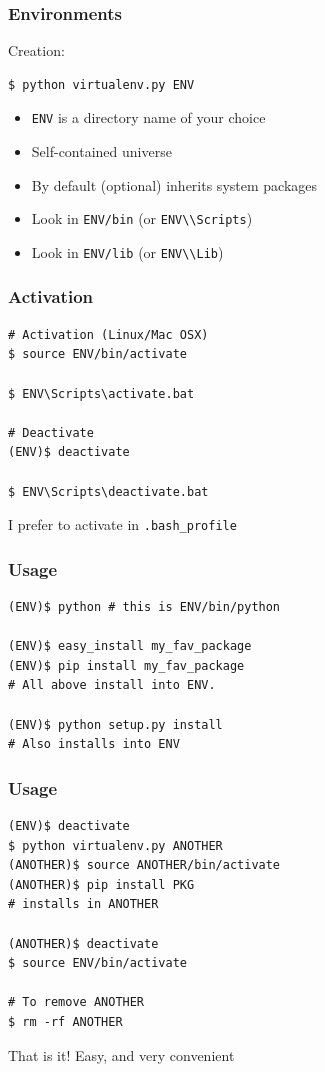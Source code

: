 \documentclass[14pt,compress]{beamer}
\newcounter{time}
\newcommand{\inctime}[1]{\addtocounter{time}{#1}{\tiny \thetime\ m}}
\newcommand{\typ}[1]{\lstinline{#1}}
\begin{document}
\begin{frame}[fragile]
  \frametitle{Environments}
Creation:

  \begin{lstlisting}
$ python virtualenv.py ENV
  \end{lstlisting}

  \begin{itemize}
      \item \typ{ENV} is a directory name of your choice
      \item Self-contained universe
      \item By default (optional) inherits system packages
      \item Look in \typ{ENV/bin} (or \typ{ENV\\Scripts})

      \item Look in \typ{ENV/lib} (or \typ{ENV\\Lib})
  \end{itemize}

\end{frame}

\begin{frame}[fragile]
  \frametitle{Activation}

  \begin{lstlisting}
# Activation (Linux/Mac OSX)
$ source ENV/bin/activate

$ ENV\Scripts\activate.bat

# Deactivate
(ENV)$ deactivate

$ ENV\Scripts\deactivate.bat
  \end{lstlisting}
  \vspace*{0.1in}
  I prefer to activate in \typ{.bash_profile}
\end{frame}

\begin{frame}[fragile]
  \frametitle{Usage}
  \begin{lstlisting}
(ENV)$ python # this is ENV/bin/python

(ENV)$ easy_install my_fav_package
(ENV)$ pip install my_fav_package
# All above install into ENV.

(ENV)$ python setup.py install
# Also installs into ENV

  \end{lstlisting}

\end{frame}

\begin{frame}[fragile]
  \frametitle{Usage}
  \vspace*{-1em}
  \begin{lstlisting}
(ENV)$ deactivate
$ python virtualenv.py ANOTHER
(ANOTHER)$ source ANOTHER/bin/activate
(ANOTHER)$ pip install PKG
# installs in ANOTHER

(ANOTHER)$ deactivate
$ source ENV/bin/activate

# To remove ANOTHER
$ rm -rf ANOTHER
\end{lstlisting}

That is it! Easy, and very convenient

\inctime{15}

\end{frame}
\end{document}
